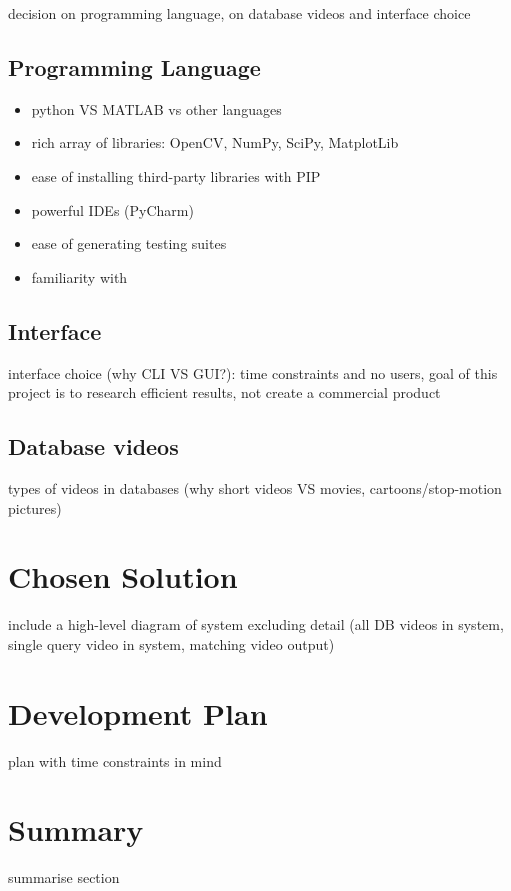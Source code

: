decision on programming language, on database videos and interface choice

\subsection{Programming Language}

\begin{itemize}
	\item python VS MATLAB vs other languages
	\item rich array of libraries: OpenCV, NumPy, SciPy, MatplotLib
	\item ease of installing third-party libraries with PIP
	\item powerful IDEs (PyCharm)
	\item ease of generating testing suites
     \item familiarity with
\end{itemize}

\subsection{Interface}

interface choice (why CLI VS GUI?): time constraints and no users, goal of this project is to research efficient results, not create a commercial product

\subsection{Database videos}

types of videos in databases (why short videos VS movies, cartoons/stop-motion pictures)

\section{Chosen Solution}

include a high-level diagram of system excluding detail (all DB videos in system, single query video in system, matching video output)

\section{Development Plan}

plan with time constraints in mind

\section{Summary}

summarise section
